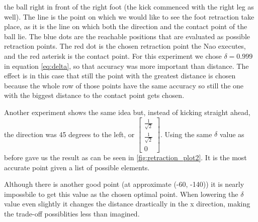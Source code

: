 \documentclass[a4paper]{article}
\begin{document}
    the ball right in front of the right foot (the kick commenced with the right
    leg as well). The line is the point on which we
    would like to see the foot retraction take place, as it is the line on which
    both the direction and the contact point of the ball lie. The blue dots are
    the reachable positions that are evaluated as possible retraction points. The red dot is the
    chosen retraction point the Nao executes, and the red asterisk is the contact
    point. For this experiment we chose 
    $\delta = 0.999$ in equation \ref{eq:delta}, so that accuracy was more important than distance. The
    effect is in this case that still the point with the greatest distance is
    chosen because the whole row of those points have the same accuracy so still
    the one with the biggest distance to the contact point gets chosen.

Another experiment shows the same idea but, instead of kicking straight ahead,
the direction was 45 degrees to the left, or $\begin{bmatrix} \frac{1}{\sqrt{2}} \\
\frac{1}{\sqrt{2}} \\ 0 \end{bmatrix}$. Using the same $\delta$ value as before gave us
the result as can be seen in \ref{fig:retraction_plot2}. It is the most
accurate point given a list of possible elements. 

Although there is another good point (at approximate (-60, -140)) it is nearly
impossbile to get this value as the chosen optimal point. When lowering the
$\delta$ value even slightly it changes the distance drastically in the x
direction, making the trade-off possiblities less than imagined.
\end{document}
